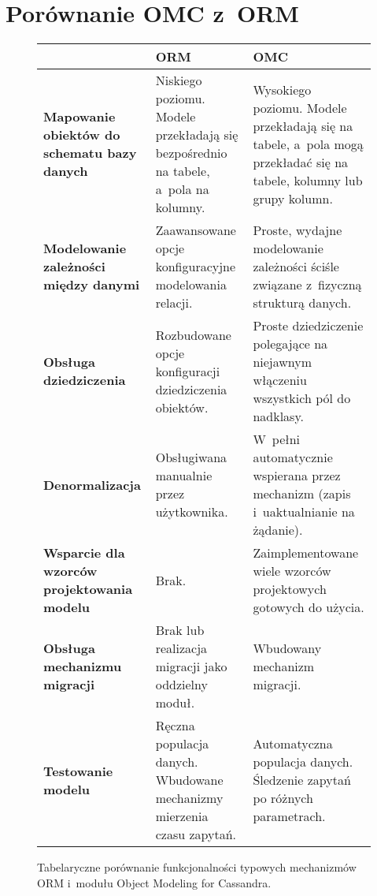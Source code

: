 \section{Porównanie OMC z~ORM}
\label{sec:omc_vs_orm_comparison}

\begin{figure}[ht!]
	\centering
	\begin{tabular}{|p{3cm}|p{4.5cm}|p{4.5cm}|}
		\hline
		& \textbf{ORM} & \textbf{OMC} \\
		\hline
		{\footnotesize \textbf{Mapowanie obiektów do schematu bazy danych}} & 
		Niskiego poziomu. Modele przekładają się bezpośrednio na tabele, a~pola na kolumny. & 
		Wysokiego poziomu. Modele przekładają się na tabele, a~pola mogą przekładać się na tabele, kolumny lub grupy kolumn. \\
		\hline
		{\footnotesize \textbf{Modelowanie zależności między danymi}} &
		Zaawansowane opcje konfiguracyjne modelowania relacji. &
		Proste, wydajne modelowanie zależności ściśle związane z~fizyczną strukturą danych. \\
		\hline
		{\footnotesize \textbf{Obsługa dziedziczenia}} & 
		Rozbudowane opcje konfiguracji dziedziczenia obiektów. & 
		Proste dziedziczenie polegające na niejawnym włączeniu wszystkich pól do nadklasy. \\
		\hline
		{\footnotesize \textbf{Denormalizacja}} &
		Obsługiwana manualnie przez użytkownika. &
		W~pełni automatycznie wspierana przez mechanizm (zapis i~uaktualnianie na żądanie). \\
		\hline
		{\footnotesize \textbf{Wsparcie dla wzorców projektowania modelu}} &
		Brak. &
		Zaimplementowane wiele wzorców projektowych gotowych do użycia. \\
		\hline 
		{\footnotesize \textbf{Obsługa mechanizmu migracji}} & 
		Brak lub realizacja migracji jako oddzielny moduł. &
		Wbudowany mechanizm migracji. \\
		\hline
		{\footnotesize \textbf{Testowanie modelu}} & 
		Ręczna populacja danych. Wbudowane mechanizmy mierzenia czasu zapytań. &
		Automatyczna populacja danych. Śledzenie zapytań po różnych parametrach. \\
		\hline
	\end{tabular}
	\caption{Tabelaryczne porównanie funkcjonalności typowych mechanizmów ORM i~modułu Object Modeling for Cassandra.}
	\label{tab:omc_vs_orm_comparison}
\end{figure}


